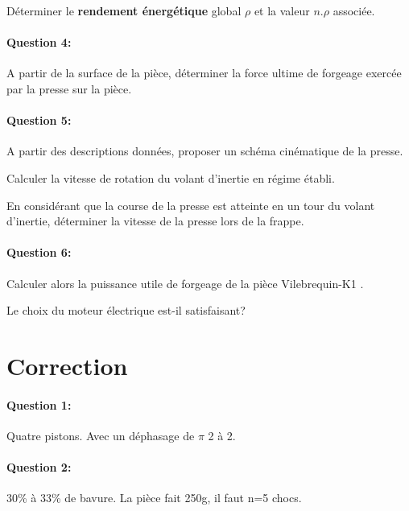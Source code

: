 Déterminer le \textbf{rendement énergétique} global $\rho$ et la valeur $n.\rho$ associée.

\paragraph{Question 4:} A partir de la surface de la pièce, déterminer la force ultime de forgeage exercée par la presse sur la pièce.

\paragraph{Question 5:} A partir des descriptions données, proposer un schéma cinématique de la presse.

Calculer la vitesse de rotation du volant d'inertie en régime établi.

En considérant que la course de la presse est atteinte en un tour du volant d'inertie, déterminer la vitesse de la presse lors de la frappe.

\paragraph{Question 6:} Calculer alors la puissance utile de forgeage de la pièce \og Vilebrequin-K1 \fg.

Le choix du moteur électrique est-il satisfaisant?





\clearpage

\ifdef{\public}{}{}

\newpage

\pagestyle{correction}

\section{Correction}

\paragraph{Question 1:} Quatre pistons. Avec un déphasage de $\pi$ 2 à 2.

\paragraph{Question 2:} 30\% à 33\% de bavure. La pièce fait 250g, il faut n=5 chocs.

